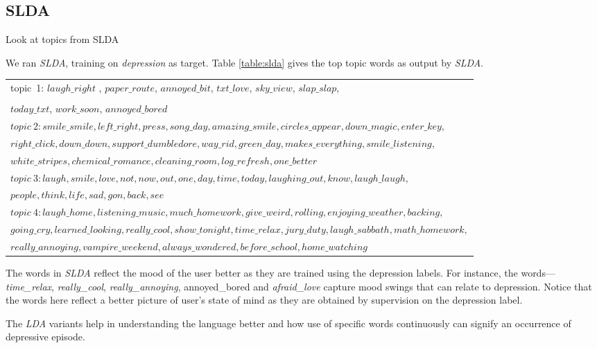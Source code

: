 \subsection{SLDA}
\label{sec:slda}
Look at topics from SLDA

We ran \textit{SLDA}, training on \textit{depression} as target. Table \ref{table:slda} gives the top topic words as output by \textit{SLDA}. 

\begin{table*} [ht!]
	\begin{tabular}{ l }
	\hline
{topic~1: $laugh\_right$	, $paper\_route$, $annoyed\_bit$,	$txt\_love$,	$sky\_view$,	$slap\_slap$, 	}\\
\indent {$social\_dance$,	$swim\_team$,	wee, 	$afraid\_love$,	$feel\_much$,	$love\_duty$,	$man\_wish$,	$talking\_best$,} \\
	{$today\_txt$,	$work\_soon$,	$annoyed\_bored$ }\\
	\midrule
${topic~2: smile\_smile,	left\_right,	press,	song\_day,	amazing\_smile,	circles\_appear	, down\_magic,	enter\_key,}$\\	
${right\_click,	down\_down,	support\_dumbledore,	way\_rid,	green\_day,	makes\_everything,	smile\_listening,}$\\
	${white\_stripes,	chemical\_romance,	cleaning\_room,	log\_refresh,	one\_better}$\\
		\midrule
${topic~3:  laugh	, smile,	love,	not,	now,	out,	one,	day,	time,	today,	laughing\_out,	know,	laugh\_laugh,	}$\\
${people,	think,	life,	sad,	gon,	back,	see}$\\
	\midrule
${topic~4: laugh\_home, 	listening\_music, 	much\_homework, 	give\_weird, 	rolling, 	enjoying\_weather, 	backing, 	}$\\	
${going\_cry,	learned\_looking,	really\_cool, show\_tonight,	time\_relax,	jury\_duty,	laugh\_sabbath,	math\_homework,}$\\
${really\_annoying,	vampire\_weekend,	always\_wondered,	before\_school,	home\_watching}$\\
\hline
    \end{tabular}
      \caption{\noindent Seed words for \textit{SeededLDA} using DSM-IV}
        \label{table:slda}
\end{table*}

The words in \textit{SLDA} reflect the mood of the user better as they are trained using the depression labels. For instance, the words---\textit{time\_relax}, \textit{really\_cool}, \textit{really\_annoying}, {annoyed\_bored} and \textit{afraid\_love} capture mood swings that can relate to depression. Notice that the words here reflect a better picture of user's state of mind as they are obtained by supervision on the depression label.

The \textit{LDA} variants help in understanding the language better and how use of specific words continuously can signify an occurrence of depressive episode.
